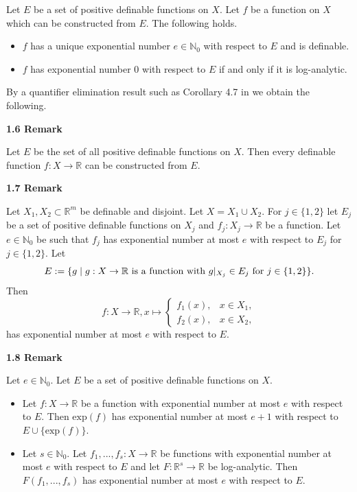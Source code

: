 \documentclass[12pt]{article}
\def\vs{\vspace}
\def\exp{\mathrm{exp}}
\begin{document}
\vs{0.1cm}
Let $E$ be a set of positive definable functions on $X$. Let $f$ be a function on $X$ which can be constructed from $E$. The following holds.
\begin{itemize}
	\item[(1)] $f$ has a unique exponential number $e \in \mathbb{N}_0$ with respect to $E$ and is definable.
	\item[(2)] $f$ has exponential number $0$ with respect to $E$ if and only if it is log-analytic. 
\end{itemize}

By a quantifier elimination result such as Corollary 4.7 in \cite {4} we obtain the following.

\vs{0.3cm}
{\bf1.6 Remark}

\vs{0.1cm}
Let $E$ be the set of all positive definable functions on $X$. Then every definable function $f:X \to \mathbb{R}$ can be constructed from $E$.

\vs{0.5cm}
{\bf1.7 Remark}

\vs{0.1cm}
Let $X_1,X_2 \subset \mathbb{R}^m$ be definable and disjoint. Let $X = X_1 \cup X_2$. For $j \in \{1,2\}$ let $E_j$ be a set of positive definable functions on $X_j$ and $f_j:X_j \to \mathbb{R}$ be a function. Let $e \in \mathbb{N}_0$ be such that $f_j$ has exponential number at most $e$ with respect to $E_j$ for $j \in \{1,2\}$. Let 
$$E:=\{g \mid g:X \to \mathbb{R} \textnormal{ is a function with } g|_{X_j} \in E_j \textnormal{ for } j \in \{1,2\}\}.$$
Then 
$$f:X \to \mathbb{R}, x \mapsto \left\{\begin{array}{ll} f_1(x) , & x \in X_1,  \\
f_2(x), & x \in X_2, \end{array}\right.$$
has exponential number at most $e$ with respect to $E$.

\vs{0.5cm}
{\bf1.8 Remark}

\vs{0.1cm}
Let $e \in \mathbb{N}_0$. Let $E$ be a set of positive definable functions on $X$.
\begin{itemize}
	\item[(1)] Let $f:X \to \mathbb{R}$ be a function with exponential number at most $e$ with respect to $E$. Then $\exp(f)$ has exponential number at most $e+1$ with respect to $E \cup \{\exp(f)\}$.
	\item[(2)] Let $s \in \mathbb{N}_0$. Let $f_1,...,f_s:X \to \mathbb{R}$ be functions with exponential number at most $e$ with respect to $E$ and let $F:\mathbb{R}^s \to \mathbb{R}$ be log-analytic. Then $F(f_1,...,f_s)$ has exponential number at most $e$ with respect to $E$. 
\end{itemize}
\end{document}
